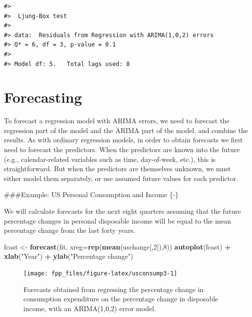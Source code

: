 \documentclass[]{book}
\newenvironment{Shaded}{\begin{snugshade}}{\end{snugshade}}
\newcommand{\DataTypeTok}[1]{\textcolor[rgb]{0.13,0.29,0.53}{#1}}
\newcommand{\DecValTok}[1]{\textcolor[rgb]{0.00,0.00,0.81}{#1}}
\newcommand{\KeywordTok}[1]{\textcolor[rgb]{0.13,0.29,0.53}{\textbf{#1}}}
\newcommand{\NormalTok}[1]{#1}
\newcommand{\OperatorTok}[1]{\textcolor[rgb]{0.81,0.36,0.00}{\textbf{#1}}}
\newcommand{\StringTok}[1]{\textcolor[rgb]{0.31,0.60,0.02}{#1}}
\begin{document}
\begin{verbatim}
#> 
#>  Ljung-Box test
#> 
#> data:  Residuals from Regression with ARIMA(1,0,2) errors
#> Q* = 6, df = 3, p-value = 0.1
#> 
#> Model df: 5.   Total lags used: 8
\end{verbatim}

\hypertarget{forecasting}{%
\section{Forecasting}\label{forecasting}}

To forecast a regression model with ARIMA errors, we need to forecast the regression part of the model and the ARIMA part of the model, and combine the results. As with ordinary regression models, in order to obtain forecasts we first need to forecast the predictors. When the predictors are known into the future (e.g., calendar-related variables such as time, day-of-week, etc.), this is straightforward. But when the predictors are themselves unknown, we must either model them separately, or use assumed future values for each predictor.

\#\#\#Example: US Personal Consumption and Income \{-\}

We will calculate forecasts for the next eight quarters assuming that the future percentage changes in personal disposable income will be equal to the mean percentage change from the last forty years.

\begin{Shaded}
\begin{Highlighting}[]
\NormalTok{fcast <-}\StringTok{ }\KeywordTok{forecast}\NormalTok{(fit, }\DataTypeTok{xreg=}\KeywordTok{rep}\NormalTok{(}\KeywordTok{mean}\NormalTok{(uschange[,}\DecValTok{2}\NormalTok{]),}\DecValTok{8}\NormalTok{))}
\KeywordTok{autoplot}\NormalTok{(fcast) }\OperatorTok{+}\StringTok{ }\KeywordTok{xlab}\NormalTok{(}\StringTok{"Year"}\NormalTok{) }\OperatorTok{+}
\StringTok{  }\KeywordTok{ylab}\NormalTok{(}\StringTok{"Percentage change"}\NormalTok{)}
\end{Highlighting}
\end{Shaded}

\begin{figure}

{\centering \texttt{[image: fpp\_files/figure-latex/usconsump3-1]} 

}

\caption{Forecasts obtained from regressing the percentage change in consumption expenditure on the percentage change in disposable income, with an ARIMA(1,0,2) error model.}\label{fig:usconsump3}
\end{figure}
\end{document}
